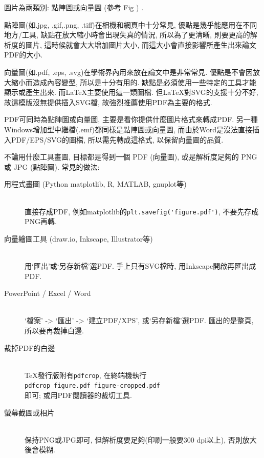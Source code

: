

圖片為兩類別: 點陣圖或向量圖 (參考 Fig ) .\\


點陣圖(如.jpg, .gif,.png, .tiff)在相機和網頁中十分常見, 優點是幾乎能應用在不同地方/工具, 缺點在放大縮小時會出現失真的情況, 所以為了更清晰, 則要更高的解析度的圖片, 這時候就會大大增加圖片大小, 而這大小會直接影響所產生出來論文PDF的大小.

向量圖(如.pdf, .eps, .svg)在學術界內用來放在論文中是非常常見. 優點是不會因放大縮小而造成內容變型, 所以是十分有用的. 缺點是必須使用一些特定的工具才能顯示或產生出來. 而LaTeX主要使用這一類圖檔. 但LaTeX對SVG的支援十分不好, 故這模版沒無提供插入SVG檔, 故強烈推薦使用PDF為主要的格式.

PDF可同時為點陣圖或向量圖, 主要是看你提供什麼圖片格式來轉成PDF. 另一種Windows增加型中繼檔(.emf)都同樣是點陣圖或向量圖, 而由於Word是沒法直接插入PDF/EPS/SVG的圖檔, 所以需先轉成這格式, 以保留向量圖的品質.

\newpage
{}

不論用什麼工具畫圖, 目標都是得到一個 PDF (向量圖), 或是解析度足夠的 PNG 或 JPG (點陣圖). 常見的做法:

\begin{description}
  \item[用程式畫圖 (Python matplotlib, R, MATLAB, gnuplot等)] \hfill\\
    直接存成PDF, 例如matplotlib的\verb|plt.savefig('figure.pdf')|, 不要先存成PNG再轉.

  \item[向量繪圖工具 (draw.io, Inkscape, Illustrator等)] \hfill\\
    用`匯出'或`另存新檔'選PDF. 手上只有SVG檔時, 用Inkscape開啟再匯出成PDF.

  \item[PowerPoint / Excel / Word] \hfill\\
    `檔案' -> `匯出' -> `建立PDF/XPS', 或`另存新檔'選PDF. 匯出的是整頁, 所以要再裁掉白邊.

  \item[裁掉PDF的白邊] \hfill\\
    TeX發行版附有\texttt{pdfcrop}, 在終端機執行\\
    \verb|pdfcrop figure.pdf figure-cropped.pdf|\\
    即可; 或用PDF閱讀器的裁切工具.

  \item[螢幕截圖或相片] \hfill\\
    保持PNG或JPG即可, 但解析度要足夠(印刷一般要300 dpi以上), 否則放大後會模糊.
\end{description}

